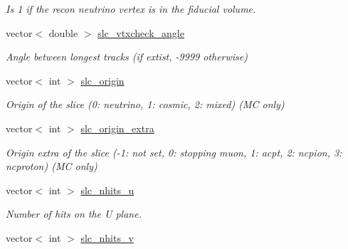 \begin{DoxyCompactItemize}
\begin{DoxyCompactList}\small\item\em Is 1 if the recon neutrino vertex is in the fiducial volume. \end{DoxyCompactList}\item 
\hypertarget{classUBXSecEvent_af9855bb4f1c558d9032c3059beb49015}{vector$<$ double $>$ \hyperlink{classUBXSecEvent_af9855bb4f1c558d9032c3059beb49015}{slc\-\_\-vtxcheck\-\_\-angle}}\label{classUBXSecEvent_af9855bb4f1c558d9032c3059beb49015}

\begin{DoxyCompactList}\small\item\em Angle between longest tracks (if extist, -\/9999 otherwise) \end{DoxyCompactList}\item 
\hypertarget{classUBXSecEvent_aebb1b1e843015c57cd10b411682dbb2e}{vector$<$ int $>$ \hyperlink{classUBXSecEvent_aebb1b1e843015c57cd10b411682dbb2e}{slc\-\_\-origin}}\label{classUBXSecEvent_aebb1b1e843015c57cd10b411682dbb2e}

\begin{DoxyCompactList}\small\item\em Origin of the slice (0\-: neutrino, 1\-: cosmic, 2\-: mixed) (M\-C only) \end{DoxyCompactList}\item 
\hypertarget{classUBXSecEvent_ac1532ccdcb92b158c2393ec6a2a816f8}{vector$<$ int $>$ \hyperlink{classUBXSecEvent_ac1532ccdcb92b158c2393ec6a2a816f8}{slc\-\_\-origin\-\_\-extra}}\label{classUBXSecEvent_ac1532ccdcb92b158c2393ec6a2a816f8}

\begin{DoxyCompactList}\small\item\em Origin extra of the slice (-\/1\-: not set, 0\-: stopping muon, 1\-: acpt, 2\-: ncpion, 3\-: ncproton) (M\-C only) \end{DoxyCompactList}\item 
\hypertarget{classUBXSecEvent_a52bec741eadb5ef5f4bf1c2322707d20}{vector$<$ int $>$ \hyperlink{classUBXSecEvent_a52bec741eadb5ef5f4bf1c2322707d20}{slc\-\_\-nhits\-\_\-u}}\label{classUBXSecEvent_a52bec741eadb5ef5f4bf1c2322707d20}

\begin{DoxyCompactList}\small\item\em Number of hits on the U plane. \end{DoxyCompactList}\item 
\hypertarget{classUBXSecEvent_a5ade1b25620def646196c0d7fa3ad7f3}{vector$<$ int $>$ \hyperlink{classUBXSecEvent_a5ade1b25620def646196c0d7fa3ad7f3}{slc\-\_\-nhits\-\_\-v}}\label{classUBXSecEvent_a5ade1b25620def646196c0d7fa3ad7f3}


\end{DoxyCompactItemize}
